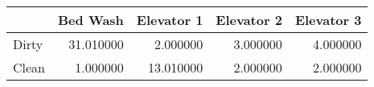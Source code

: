 \begin{tabular}{lrrrr}
\toprule
 & Bed Wash & Elevator 1 & Elevator 2 & Elevator 3 \\
\midrule
Dirty & 31.010000 & 2.000000 & 3.000000 & 4.000000 \\
Clean & 1.000000 & 13.010000 & 2.000000 & 2.000000 \\
\bottomrule
\end{tabular}
